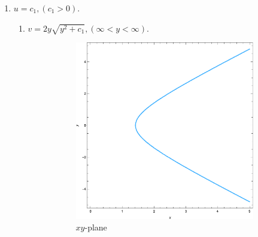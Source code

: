 \documentclass[12pt]{book}
\begin{document}
\begin{enumerate}
    \item $u = c_1, (c_1 > 0).$
    \begin{enumerate}[label = {(\roman*)}]
        \item 
            $v = 2y\sqrt{y^2 + c_1}, (\infty < y < \infty).$
            \begin{figure}[H]
                \centering
                \begin{subfigure}{0.45\textwidth}
                    \centering
                    \includegraphics[width = \textwidth]{./figs/chapter_1/f_map_1_1.eps}
                    \caption{$xy$-plane}
                \end{subfigure}
                \qquad
                \begin{subfigure}{0.45\textwidth}
                    \centering

\end{subfigure}
\end{figure}
\end{enumerate}
\end{enumerate}
\end{document}

